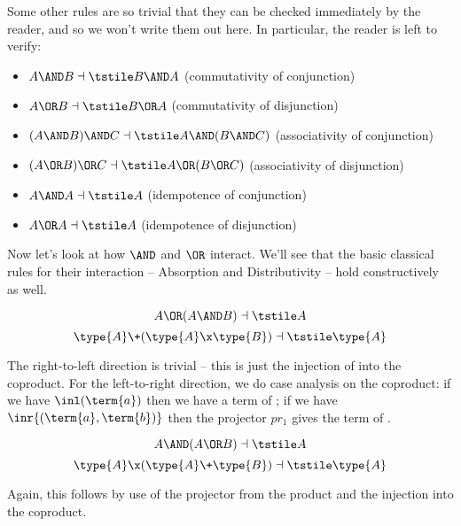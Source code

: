 Some other rules are so trivial that they can be checked immediately by the reader, and so we won't write them out here.  In particular, the reader is left to verify:
\begin{samepage}
\begin{itemize} 

\item $A \AND B \dashv \tstile B \AND A$ (commutativity of conjunction)

\item $A \OR B \dashv \tstile B \OR A$  (commutativity of disjunction)

\item $(A \AND B) \AND C \dashv \tstile A \AND (B \AND C)$ (associativity of conjunction)

\item $(A \OR B) \OR C \dashv \tstile A \OR (B \OR C)$ (associativity of disjunction)

\item $A \AND A \dashv \tstile A$ (idempotence of conjunction)

\item $A \OR A \dashv \tstile A$ (idempotence of disjunction)
\end{itemize}
\end{samepage}



Now let's look at how $\AND$ and $\OR$ interact.  We'll see that the basic classical rules for their interaction -- Absorption and Distributivity -- hold constructively as well.


\begin{Theorem}[Absorption1]
\[
A \OR (A \AND B) \dashv \tstile A
\]
\[
\type{A} \+ (\type{A} \x \type{B}) \dashv \tstile \type{A}
\]
\end{Theorem}
\begin{Proof}
The right-to-left direction is trivial -- this is just the injection of  into the coproduct.  For the left-to-right direction, we do case analysis on the coproduct: if we have $\inl(\term{a})$ then we have a term of ; if we have $\inr{(\term{a},\term{b})}$ then the projector $pr_1$ gives the term of .
\end{Proof}

\begin{Theorem}[Absorption2]
\[
A \AND (A \OR B) \dashv \tstile A
\]
\[
\type{A} \x (\type{A} \+ \type{B}) \dashv \tstile \type{A}
\]
\end{Theorem}
\begin{Proof}
Again, this follows by use of the projector from the product and the injection into the coproduct.
\end{Proof}




